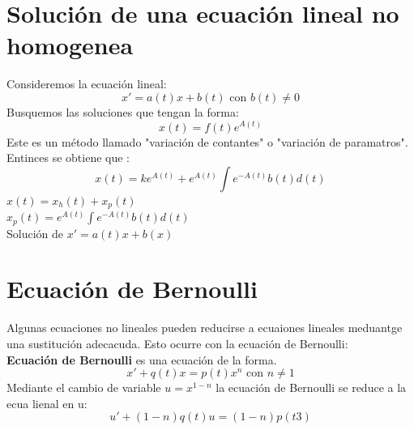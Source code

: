 \documentclass{book}
\begin{document}
    \section{Solución de una ecuación lineal no homogenea}
    Consideremos la ecuación lineal: 
    \begin{equation*}
        x'=a(t)x+b(t) \text{ con } b(t) \not =0
    \end{equation*}
    Busquemos las soluciones que tengan la forma: 
    \begin{equation*}
        x(t) = f(t)e^{A(t)}
    \end{equation*}
    Este es un método llamado "variación de contantes" o "variación de paramatros". Entinces se obtiene que : 
    \begin{equation*}
        x(t) = ke^{A(t)} +e^{A(t)} \int e^{-A(t)}b(t)d(t)
    \end{equation*}
    $x(t)=x_{h}(t)+x_{p}(t)$ 
    \\ $x_{p}(t) = e^{A(t)} \int e^{-A(t)}b(t)d(t)$ \\ 
    Solución de 
    $x'=a(t)x+b(x)$ \\ 
    \section{Ecuación de Bernoulli}
    Algunas ecuaciones no lineales pueden reducirse a ecuaiones lineales meduantge una sustitución adecacuda. 
    Esto ocurre con la ecuación de Bernoulli: 
    \\ 
    \textbf{Ecuación de Bernoulli} 
    es una ecuación de la forma. 
    \begin{equation*}
        x'+q(t)x=p(t)x^{n} \text{ con } n \not = 1
    \end{equation*}
    Mediante el cambio de variable $u = x^{1-n}$ la ecuación de Bernoulli se reduce a la ecua lienal en u: 
    \begin{equation*}
        u'+(1-n)q(t)u=(1-n)p(t3)
    \end{equation*}
\end{document}
